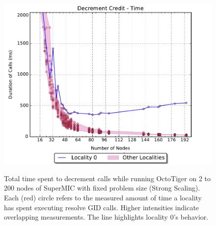 \begin{figure}[h]
    \centering
    \caption{Total time spent to decrement calls while running OctoTiger on 2 to 200 nodes of SuperMIC with fixed problem size (Strong Scaling). Each (red) circle refers to the measured amount of time a locality has spent executing resolve GID calls. Higher intensities indicate overlapping measurements. The line highlights locality 0's behavior.}
    \includegraphics[width=.54\textwidth,height=\textheight,keepaspectratio]{graphs/octotiger_decrement_credit_time}
    \label{fig:octgr_strong_decr_cred}
\end{figure}


